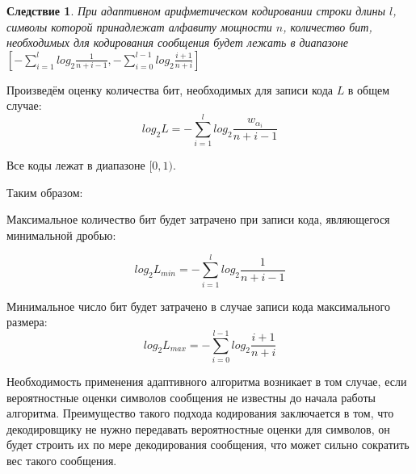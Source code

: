 \documentclass[12pt]{article}
\begin{document}
\newtheorem{Cons}{Следствие}
\begin{Cons}
При адаптивном арифметическом кодировании строки длины $l$, символы которой принадлежат алфавиту мощности $n$, количество бит, необходимых для кодирования сообщения будет лежать в диапазоне $[-\sum_{i=1}^{l} log_2{\frac{1}{n+i-1}}, -\sum_{i=0}^{l-1}log_2\frac{i+1}{n+i}]$
\end{Cons}

\begin{Proof}
Произведём оценку количества бит, необходимых для записи кода $L$ в общем случае:
\[
log_2 L = -\sum_{i=1}^{l} log_2 \frac{w_{\alpha_i}}{n+i-1}
\]

Все коды лежат в диапазоне $[0, 1)$. 

Таким образом:

Максимальное количество бит будет затрачено при записи кода, являющегося минимальной дробью:

\[
log_2 L_{min} = -\sum_{i=1}^{l} log_2 \frac{1}{n+i-1}
\]

Минимальное число бит будет затрачено в случае записи кода максимального размера:
\[
log_2 L_{max} = -\sum_{i=0}^{l-1} log_2 \frac{i+1}{n+i}
\]
\end{Proof}

Необходимость применения адаптивного алгоритма возникает в том случае, если вероятностные оценки символов сообщения не известны до начала работы алгоритма. Преимущество такого подхода кодирования заключается в том, что декодировщику не нужно передавать вероятностные оценки для символов, он будет строить их по мере декодирования сообщения, что может сильно сократить вес такого сообщения. 
\end{document}
